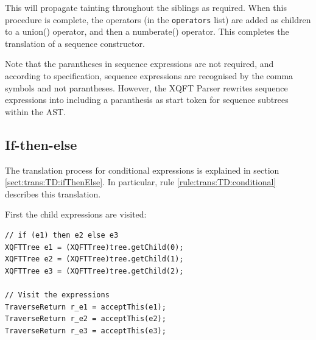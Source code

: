 %     
% 
%         
% 

This will propagate tainting throughout the siblings as required. When this
procedure is complete, the operators (in the \texttt{operators} list) are
added as children to a \textsf{union()} operator, and then a
\textsf{numberate()} operator. This completes the translation of a sequence
constructor.

Note that the parantheses in sequence expressions are not required, and
according to specification, sequence expressions are recognised by the comma
symbols and not parantheses. However, the XQFT Parser rewrites sequence
expressions into including a paranthesis as start token for sequence subtrees
within the AST.

\subsection{If-then-else}
The translation process for conditional expressions is explained in section
\ref{sect:trans:TD:ifThenElse}. In particular, rule
\ref{rule:trans:TD:conditional} describes this translation. 

First the child expressions are visited:

\begin{Verbatim}
// if (e1) then e2 else e3
XQFTTree e1 = (XQFTTree)tree.getChild(0); 
XQFTTree e2 = (XQFTTree)tree.getChild(1);
XQFTTree e3 = (XQFTTree)tree.getChild(2);
        
// Visit the expressions
TraverseReturn r_e1 = acceptThis(e1);
TraverseReturn r_e2 = acceptThis(e2);
TraverseReturn r_e3 = acceptThis(e3);
\end{Verbatim}

